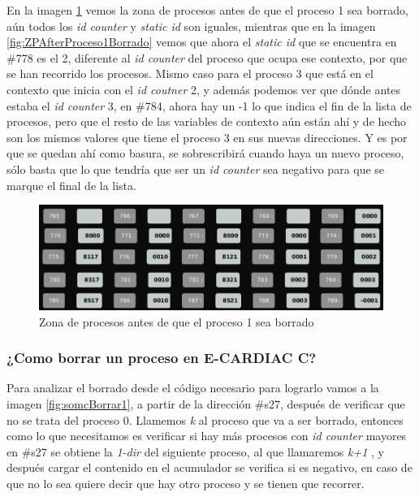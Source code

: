 \documentclass[letterpaper,12pt,oneside]{book}
\begin{document}
		En la imagen \ref{fig:ZPBeforeProceso1Terminado} vemos la zona de procesos antes de que el proceso 1 sea borrado, aún todos los \textit{id counter} y
		\textit{static id} son iguales, mientras que en la imagen \ref{fig:ZPAfterProceso1Borrado} vemos que ahora el \textit{static id} que se encuentra en
		\#778 es el 2, diferente al \textit{id counter} del proceso que ocupa ese contexto, por que se han recorrido los procesos. Mismo caso para el proceso 3
		que está en el contexto que inicia con el \textit{id coutner} 2, y además podemos ver que dónde antes estaba el \textit{id counter} 3, en \#784, ahora
		hay un -1 lo que indica el fin de la lista de procesos, pero que el resto de las variables de contexto aún están ahí y de hecho son los mismos valores
		que tiene el proceso 3 en sus nuevas direcciones. Y es por que se quedan ahí como basura, se sobrescribirá cuando haya un nuevo proceso, sólo basta
		que lo que tendría que ser un \textit{id counter} sea negativo para que se marque el final de la lista.
		
		\begin{figure}[h]		
			\centering
			\includegraphics[scale=0.45]{media/CARDIACC/ZPBeforeProceso1Terminado.png}
			\caption{ Zona de procesos antes de que el proceso 1 sea borrado }
			\label{fig:ZPBeforeProceso1Terminado}
		\end{figure}
		
		
		\subsubsection{¿Como borrar un proceso en E-CARDIAC C?}
		
		
		Para analizar el borrado desde el código necesario para lograrlo vamos a la imagen \ref{fig:somcBorrar1}, a partir de la dirección \#s27, después
		de verificar que no se trata del proceso 0. Llamemos \textit{k} al proceso que va a ser borrado, entonces como lo que necesitamos
		es verificar si hay más procesos con \textit{id counter} mayores en \#s27
		se obtiene la \textit{1-dir} del siguiente proceso, al que llamaremos \textit{k+1}
		, y después cargar el contenido en el acumulador
		se verifica si es negativo, en caso de que no lo sea quiere decir que hay otro proceso y se tienen que recorrer.
		
\end{document}
